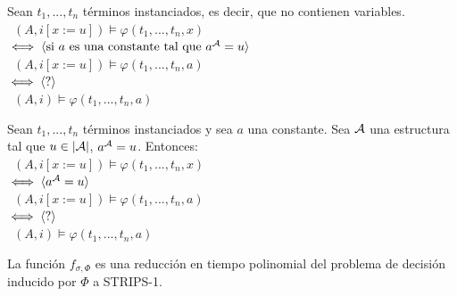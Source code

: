 \begin{theorem}
\label{t1}
Sean $t_1,...,t_n$ términos instanciados, es decir, que no contienen
variables.\\
\mbox{\hspace{5mm} $(A, i[x:=u]) \models \varphi(t_1,...,t_n,x)$}\\
$\iff \langle \text{si $a$ es una constante tal que } a^{\mathcal{A}} = u \rangle$\\
\mbox{\hspace{5mm} $(A, i[x:=u]) \models \varphi(t_1,...,t_n,a)$}\\
$\iff \langle \text{?} \rangle$\\
\mbox{\hspace{5mm} $(A, i) \models \varphi(t_1,...,t_n,a)$}\\
\end{theorem}
\begin{lemma}
Sean $t_1,...,t_n$ términos instanciados y sea $a$ una constante. Sea $\mathcal{A}$ una
estructura tal que $u \in |\mathcal{A}|$, $a^{\mathcal{A}} = u$. Entonces:\\
\mbox{\hspace{5mm} $(A, i[x:=u]) \models \varphi(t_1,...,t_n,x)$}\\
$\iff \langle a^{\mathcal{A}} = u \rangle$\\
\mbox{\hspace{5mm} $(A, i[x:=u]) \models \varphi(t_1,...,t_n,a)$}\\
$\iff \langle \text{?} \rangle$\\
\mbox{\hspace{5mm} $(A, i) \models \varphi(t_1,...,t_n,a)$}\\
\end{lemma}


\begin{theorem}
La función $f_{\sigma, \Phi}$ es una reducción en tiempo polinomial del
problema de decisión inducido por $\Phi$ a STRIPS-1.
\end{theorem}

